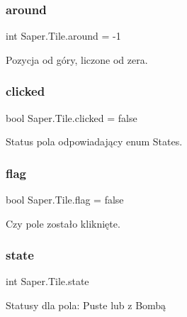 \subsubsection{\texorpdfstring{around}{around}}
{\footnotesize\ttfamily int Saper.\+Tile.\+around = -\/1}



Pozycja od góry, liczone od zera. 

\mbox{\label{class_saper_1_1_tile_a0b3e70fcbb158d0d48856f4f1c21e74c}} 
\subsubsection{\texorpdfstring{clicked}{clicked}}
{\footnotesize\ttfamily bool Saper.\+Tile.\+clicked = false}



Status pola odpowiadający enum States. 

\mbox{\label{class_saper_1_1_tile_a558d8534615ae6ddcbdbef636b0b7d16}} 
\subsubsection{\texorpdfstring{flag}{flag}}
{\footnotesize\ttfamily bool Saper.\+Tile.\+flag = false}



Czy pole zostało kliknięte. 

\mbox{\label{class_saper_1_1_tile_a59c61b4cd8fc0665533989c017b23688}} 
\subsubsection{\texorpdfstring{state}{state}}
{\footnotesize\ttfamily int Saper.\+Tile.\+state}



Statusy dla pola\+: Puste lub z Bombą 

\mbox{\label{class_saper_1_1_tile_af14b4a73e2ea580fe25cf29eba901f83}} 

